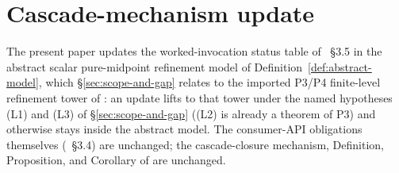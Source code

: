 \documentclass[11pt]{article}
\theoremstyle{plain}
\theoremstyle{definition}
\theoremstyle{remark}
\begin{document}
\section{Cascade-mechanism update}\label{sec:cascade-mechanism-update}

The present paper updates the worked-invocation status table of
\cite{CascadeMechanism}~\S3.5 in the abstract scalar pure-midpoint
refinement model of Definition~\ref{def:abstract-model}, which
\S\ref{sec:scope-and-gap} relates to the imported P3/P4
finite-level refinement tower of
\cite{CascadeRefinementSpaces, CascadeClosureDynamics}: an update
lifts to that tower under the named hypotheses
\textup{(L1)} and \textup{(L3)} of \S\ref{sec:scope-and-gap}
((L2) is already a theorem of P3) and otherwise stays inside the
abstract model. The consumer-API
obligations themselves (\cite{CascadeMechanism}~\S3.4) are
unchanged; the cascade-closure mechanism, Definition, Proposition,
and Corollary of \cite{CascadeMechanism} are unchanged.
\end{document}
